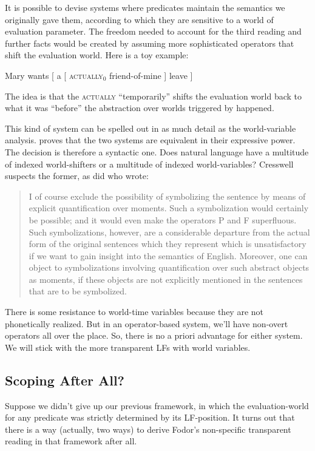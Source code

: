 It is possible to devise systems where predicates maintain the semantics we originally gave them, according to which they are sensitive to a world of evaluation parameter. The freedom needed to account for the third reading and further facts would be created by assuming more sophisticated operators that shift the evaluation world. Here is a toy example:

\ex Mary wants [ a [ \textsc{actually}$_0$ friend-of-mine ] leave ] \xe

The idea is that the \textsc{actually} ``temporarily'' shifts the evaluation world back to what it was ``before'' the abstraction over worlds triggered by  happened.

This kind of system can be spelled out in as much detail as the world-variable analysis. \citet{cresswell:entities} proves that the two systems are equivalent in their expressive power. The decision is therefore a syntactic one. Does natural language have a multitude of indexed world-shifters or a multitude of indexed world-variables? Cresswell suspects the former, as did \citet{kamp:now} who wrote:

\begin{quote}
  I of course exclude the possibility of symbolizing the sentence by means of explicit quantification over moments. Such a symbolization would certainly be possible; and it would even make the operators P and F superfluous. Such symbolizations, however, are a considerable departure from the actual form of the original sentences which they represent \dash which is unsatisfactory if we want to gain insight into the semantics of English. Moreover, one can object to symbolizations involving quantification over such abstract objects as moments, if these objects are not explicitly mentioned in the sentences that are to be symbolized. 
\end{quote}
%
There is some resistance to world-time variables because they are not phonetically realized. But in an operator-based system, we'll have non-overt operators all over the place. So, there is no a priori advantage for either system. We will stick with the more transparent LFs with world variables.

\subsection{Scoping After All?}

Suppose we didn't give up our previous framework, in which the evaluation-world for any predicate was strictly determined by its LF-position. It turns out that there is a way (actually, two ways) to derive Fodor's non-specific transparent reading in that framework after all.

